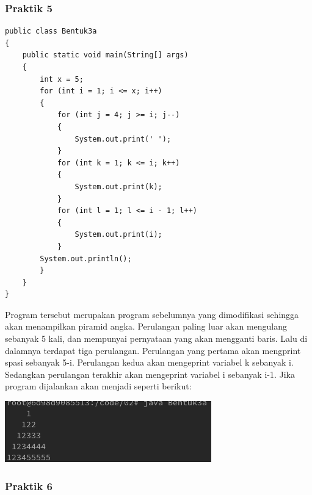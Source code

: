 \documentclass[a4paper,12pt]{article}
\begin{document}
\subsubsection{Praktik 5}

\begin{lstlisting}
public class Bentuk3a
{
    public static void main(String[] args)
    {
        int x = 5;
        for (int i = 1; i <= x; i++)
        {
            for (int j = 4; j >= i; j--)
            {
                System.out.print(' ');
            }
            for (int k = 1; k <= i; k++)
            {
                System.out.print(k);
            }
            for (int l = 1; l <= i - 1; l++)
            {
                System.out.print(i);
            }
        System.out.println();
        }
    }
}
\end{lstlisting}
Program tersebut merupakan program sebelumnya yang dimodifikasi sehingga akan menampilkan piramid angka. Perulangan paling luar akan mengulang sebanyak 5 kali, dan 
mempunyai pernyataan yang akan mengganti baris. Lalu di dalamnya terdapat tiga perulangan. Perulangan yang pertama akan mengprint spasi sebanyak 5-i. Perulangan 
kedua akan mengeprint variabel k sebanyak i. Sedangkan perulangan terakhir akan mengeprint variabel i sebanyak i-1. Jika program dijalankan akan menjadi seperti berikut:\\
\begin{center}
    \includegraphics[scale=.7]{6.png}
\end{center}

\subsubsection{Praktik 6}
\end{document}
